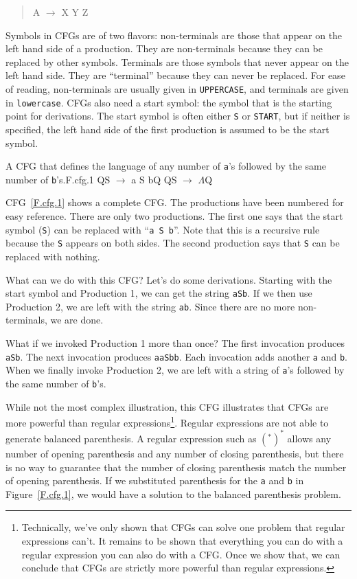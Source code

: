 \documentclass[letterpaper,12pt,openany,reqno]{book}%
\newcommand{\code}[1] {\lstinline[breaklines=yes,breakatwhitespace=yes]{#1}}
\newcommand{\cfgprod}[2] {{\ttfamily #1} $\rightarrow$ {\ttfamily #2}}
\newcommand{\cfgindentprod}[2] {\begin{quote} {\ttfamily #1} $\rightarrow$ {\ttfamily #2} \end{quote}}
\begin{document}
\cfgindentprod{A}{X Y Z}

Symbols in CFGs are of two flavors: non-terminals are those that appear on the left hand side of a production. They are non-terminals because they can be replaced by other symbols. Terminals are those symbols that never appear on the left hand side. They are ``terminal'' because they can never be replaced. For ease of reading, non-terminals are usually given in \texttt{UPPERCASE}, and terminals are given in \texttt{lowercase}. CFGs also need a start symbol: the symbol that is the starting point for derivations. The start symbol is often either \code{S} or \code{START}, but if neither is specified, the left hand side of the first production is assumed to be the start symbol.

\begin{cfg}{A CFG that defines the language of any number of \code{a}'s followed by the same number of \code{b}'s.}{F.cfg.1}
Q\cfgprod{S}{a S b}Q
Q\cfgprod{S}{$\Lambda$}Q
\end{cfg}

CFG~\ref{F.cfg.1} shows a complete CFG. The productions have been numbered for easy reference. There are only two productions. The first one says that the start symbol (\code{S}) can be replaced with ``\code{a S b}''. Note that this is a recursive rule because the \code{S} appears on both sides. The second production says that \code{S} can be replaced with nothing.

What can we do with this CFG? Let's do some derivations. Starting with the start symbol and Production 1, we can get the string \code{aSb}. If we then use Production 2, we are left with the string \code{ab}. Since there are no more non-terminals, we are done.

What if we invoked Production 1 more than once? The first invocation produces \code{aSb}. The next invocation produces \code{aaSbb}. Each invocation adds another \code{a} and \code{b}. When we finally invoke Production 2, we are left with a string of \code{a}'s followed by the same number of \code{b}'s.

While not the most complex illustration, this CFG illustrates that CFGs are more powerful than regular expressions\footnote{Technically, we've only shown that CFGs can solve one problem that regular expressions can't. It remains to be shown that everything you can do with a regular expression you can also do with a CFG. Once we show that, we can conclude that CFGs are strictly more powerful than regular expressions.}. Regular expressions are not able to generate balanced parenthesis. A regular expression such as $(^*)^*$ allows any number of opening parenthesis and any number of closing parenthesis, but there is no way to guarantee that the number of closing parenthesis match the number of opening parenthesis. If we substituted parenthesis for the \code{a} and \code{b} in Figure~\ref{F.cfg.1}, we would have a solution to the balanced parenthesis problem.
\end{document}
